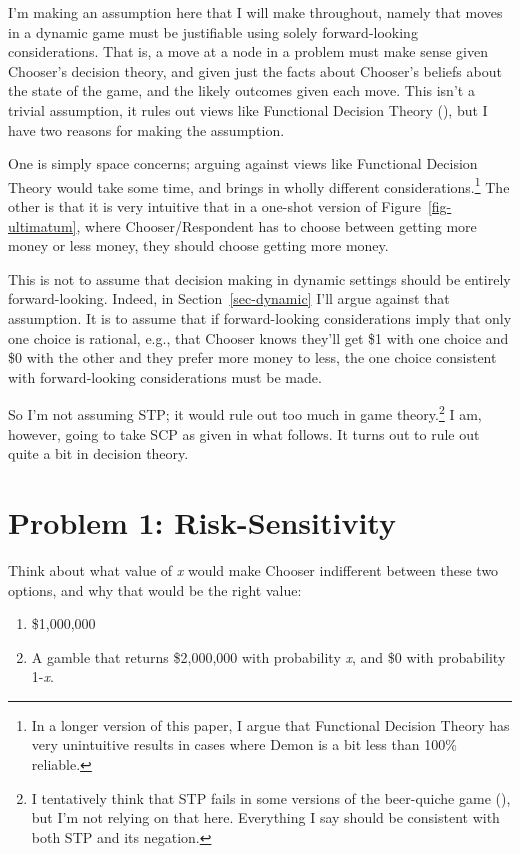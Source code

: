 \documentclass[
  10pt,
  letterpaper,
  DIV=11,
  numbers=noendperiod,
  twoside]{scrartcl}
\providecommand{\tightlist}{%
  \setlength{\itemsep}{0pt}\setlength{\parskip}{0pt}}\usepackage{longtable,booktabs,array}
\begin{document}
I'm making an assumption here that I will make throughout, namely that
moves in a dynamic game must be justifiable using solely forward-looking
considerations. That is, a move at a node in a problem must make sense
given Chooser's decision theory, and given just the facts about
Chooser's beliefs about the state of the game, and the likely outcomes
given each move. This isn't a trivial assumption, it rules out views
like Functional Decision Theory
(), but I
have two reasons for making the assumption.

One is simply space concerns; arguing against views like Functional
Decision Theory would take some time, and brings in wholly different
considerations.\footnote{In a longer version of this paper, I argue that
  Functional Decision Theory has very unintuitive results in cases where
  Demon is a bit less than 100\% reliable.} The other is that it is very
intuitive that in a one-shot version of Figure~\ref{fig-ultimatum},
where Chooser/Respondent has to choose between getting more money or
less money, they should choose getting more money.

This is not to assume that decision making in dynamic settings should be
entirely forward-looking. Indeed, in Section~\ref{sec-dynamic} I'll
argue against that assumption. It is to assume that if forward-looking
considerations imply that only one choice is rational, e.g., that
Chooser knows they'll get \$1 with one choice and \$0 with the other and
they prefer more money to less, the one choice consistent with
forward-looking considerations must be made.

So I'm not assuming STP; it would rule out too much in game
theory.\footnote{I tentatively think that STP fails in some versions of
  the beer-quiche game (), but I'm not relying on that here. Everything I say should be
  consistent with both STP and its negation.} I am, however, going to
take SCP as given in what follows. It turns out to rule out quite a bit
in decision theory.

\section{Problem 1: Risk-Sensitivity}\label{sec-buchak}

Think about what value of \emph{x} would make Chooser indifferent
between these two options, and why that would be the right value:

\begin{enumerate}
\def\labelenumi{\arabic{enumi}.}
\tightlist
\item
  \$1,000,000
\item
  A gamble that returns \$2,000,000 with probability \emph{x}, and \$0
  with probability 1-\emph{x}.
\end{enumerate}
\end{document}
